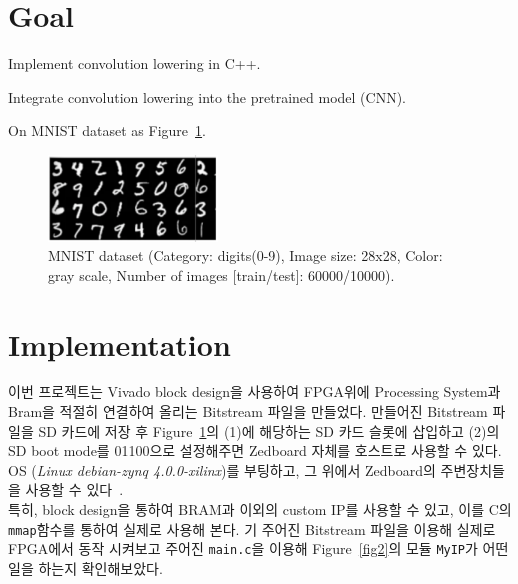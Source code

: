 \documentclass{article}
\begin{document}
\pagestyle{fancy}

\section*{Goal}

\begin{itemize*}
\item Implement convolution lowering in C++.
\item Integrate convolution lowering into the pretrained model (CNN).
\begin{itemize*}
\item On MNIST dataset as Figure~\ref{fig1}.
\end{itemize*}
\end{itemize*}
\begin{figure}[ht]
	\centering
	\includegraphics[width=0.4\textwidth]{fig/mnist.png}
\caption{MNIST dataset (Category: digits(0-9), Image size: 28x28, Color: gray scale, Number of images [train/test]: 60000/10000).}
\label{fig1}
\end{figure}

\section{Implementation}
이번 프로젝트는 Vivado block design을 사용하여 FPGA위에 Processing System과 Bram을 적절히 연결하여 올리는 Bitstream 파일을 만들었다.
만들어진 Bitstream 파일을 SD 카드에 저장 후 Figure~\ref{fig1}의 (1)에 해당하는 SD 카드 슬롯에 삽입하고 (2)의 SD boot mode를 01100으로 설정해주면 Zedboard 자체를 호스트로 사용할 수 있다. OS (\textit{Linux debian-zynq 4.0.0-xilinx})를 부팅하고, 그 위에서 Zedboard의 주변장치들을 사용할 수 있다~\cite{lab}.\\

특히, block design을 통하여 BRAM과 이외의 custom IP를 사용할 수 있고, 이를 C의 \texttt{mmap}함수를 통하여 실제로 사용해 본다. 
기 주어진 Bitstream 파일을 이용해 실제로 FPGA에서 동작 시켜보고 주어진 \texttt{main.c}을 이용해 Figure~\ref{fig2}의 모듈 \texttt{MyIP}가 어떤 일을 하는지 확인해보았다.

\newpage
\end{document}
